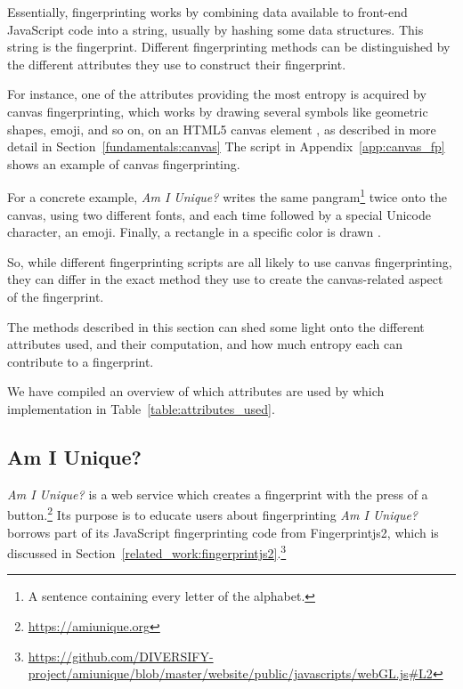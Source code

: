 \documentclass[
    fontsize=12pt,
    headings=small,
    parskip=half,
    bibliography=totoc,
    numbers=noenddot,
    open=any
    ]{scrreprt}
\begin{document}
Essentially, fingerprinting works by combining data available to front-end JavaScript code into a string,
usually by hashing some data structures. This string is the fingerprint.
Different fingerprinting methods can be distinguished by the different attributes they use to construct their fingerprint.

For instance, one of the attributes providing the most entropy is acquired by canvas fingerprinting, which works by drawing
several symbols like geometric shapes, emoji, and so on, on an HTML5 canvas element \cite{laperdrix2016beauty},
as described in more detail in Section~\ref{fundamentals:canvas}
The script in Appendix~\ref{app:canvas_fp} shows an example of canvas fingerprinting.

For a concrete example, \textit{Am I Unique?} writes the same pangram\footnote{A sentence containing every letter of the alphabet.}
twice onto the canvas, using two different fonts, and each time followed by a special Unicode character, an emoji.
Finally, a rectangle in a specific color is drawn \cite{laperdrix2016beauty}.

So, while different fingerprinting scripts are all likely to use canvas fingerprinting, they can differ in the exact
method they use to create the canvas-related aspect of the fingerprint.

The methods described in this section can shed some light onto the different attributes used, and their computation,
and how much entropy each can contribute to a fingerprint.

We have compiled an overview of which attributes are used by which implementation in Table~\ref{table:attributes_used}.


\subsection{Am I Unique?}
\label{related_work:am_i_unique}
\textit{Am I Unique?} \cite{laperdrix2016beauty} is a web service which creates
a fingerprint with the press of a button.\footnote{\url{https://amiunique.org}}
Its purpose is to educate users about fingerprinting
\textit{Am I Unique?} borrows part of its JavaScript fingerprinting code from
Fingerprintjs2, which is discussed in Section~\ref{related_work:fingerprintjs2}.\footnote{\url{https://github.com/DIVERSIFY-project/amiunique/blob/master/website/public/javascripts/webGL.js\#L2}}


\end{document}
